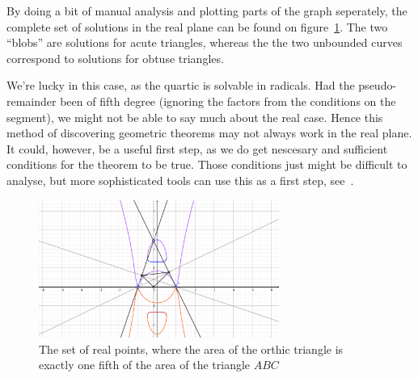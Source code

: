 \begin{example}
  By doing a bit of manual analysis and plotting parts of the graph seperately, the complete set of solutions in the real plane can be found on figure~\ref{fig:orthic_wow}. The two ``blobs'' are solutions for acute triangles, whereas the the two unbounded curves correspond to solutions for obtuse triangles.

  We're lucky in this case, as the quartic is solvable in radicals. Had the pseudo-remainder been of fifth degree (ignoring the factors from the conditions on the segment), we might not be able to say much about the real case. Hence this method of discovering geometric theorems may not always work in the real plane. It could, however, be a useful first step, as we do get nescesary and sufficient conditions for the theorem to be true. Those conditions just might be difficult to analyse, but more sophisticated tools can use this as a first step, see~\cite{10.1145/2755996.2756646}.

\end{example}

\begin{figure}[t]
  \begin{center}
    \includegraphics[width=0.7\textwidth]{geogebra_orthic_wow.png}
  \end{center}
  \caption{The set of real points, where the area of the orthic triangle is exactly one fifth of the area of the triangle $ABC$}\label{fig:orthic_wow}
\end{figure}










